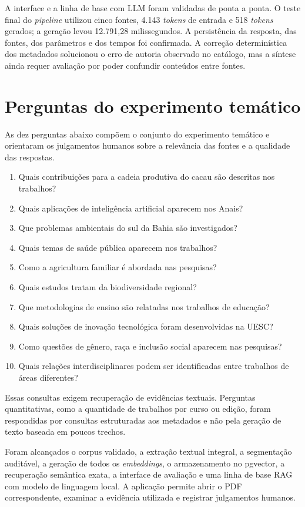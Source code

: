 A interface e a linha de base com LLM foram validadas de ponta a ponta. O teste final do \textit{pipeline} utilizou cinco fontes, 4.143 \textit{tokens} de entrada e 518 \textit{tokens} gerados; a geração levou 12.791,28 milissegundos. A persistência da resposta, das fontes, dos parâmetros e dos tempos foi confirmada. A correção determinística dos metadados solucionou o erro de autoria observado no catálogo, mas a síntese ainda requer avaliação por poder confundir conteúdos entre fontes.

\section{Perguntas do experimento temático}

As dez perguntas abaixo compõem o conjunto do experimento temático e orientaram os julgamentos humanos sobre a relevância das fontes e a qualidade das respostas.

\begin{enumerate}
    \item Quais contribuições para a cadeia produtiva do cacau são descritas nos trabalhos?
    \item Quais aplicações de inteligência artificial aparecem nos Anais?
    \item Que problemas ambientais do sul da Bahia são investigados?
    \item Quais temas de saúde pública aparecem nos trabalhos?
    \item Como a agricultura familiar é abordada nas pesquisas?
    \item Quais estudos tratam da biodiversidade regional?
    \item Que metodologias de ensino são relatadas nos trabalhos de educação?
    \item Quais soluções de inovação tecnológica foram desenvolvidas na UESC?
    \item Como questões de gênero, raça e inclusão social aparecem nas pesquisas?
    \item Quais relações interdisciplinares podem ser identificadas entre trabalhos de áreas diferentes?
\end{enumerate}

Essas consultas exigem recuperação de evidências textuais. Perguntas quantitativas, como a quantidade de trabalhos por curso ou edição, foram respondidas por consultas estruturadas aos metadados e não pela geração de texto baseada em poucos trechos.

Foram alcançados o corpus validado, a extração textual integral, a segmentação auditável, a geração de todos os \textit{embeddings}, o armazenamento no pgvector, a recuperação semântica exata, a interface de avaliação e uma linha de base RAG com modelo de linguagem local. A aplicação permite abrir o PDF correspondente, examinar a evidência utilizada e registrar julgamentos humanos.


